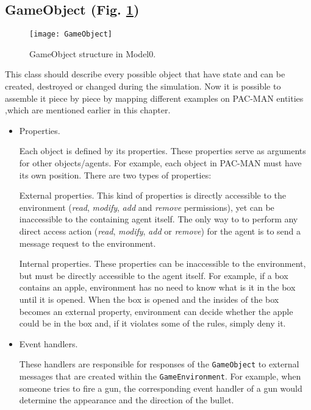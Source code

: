 \subsection{GameObject (Fig. \ref{GameObj})}
 \begin{figure}[p]
    \begin{center}
      \texttt{[image: GameObject]}
      \caption{GameObject structure in Model0.}
      \label{GameObj}
     \end{center}
    \end{figure}
This class should describe every possible object that have state and can be created, destroyed or changed during the simulation.
Now it is possible to assemble it piece by piece by mapping different examples on PAC-MAN entities ,which are mentioned earlier in this chapter.
\begin{itemize}
\item Properties. \par
Each object is defined by its properties.
These properties serve as arguments for other objects/agents. For example, each object in PAC-MAN must have its own position. There are two types of properties:
\begin{definition}{External properties}. This kind of properties is directly accessible to the environment (\textit{read}, \textit{modify}, \textit{add} and \textit{remove} permissions), yet can be inaccessible to the containing agent itself. The only way to to perform any direct access action (\textit{read}, \textit{modify}, \textit{add} or \textit{remove}) for the agent is to send a message request to the environment.
 \end{definition}
\begin{definition}{Internal properties.} These properties can be inaccessible to the environment, but must be directly accessible to the agent itself. For example, if a box contains an apple, environment has no need to know what is it in the box until it is opened. When the box is opened and the insides of the box becomes an external property, environment can decide whether the apple could be in the box and, if it violates some of the rules, simply deny it.
 \end{definition}
\item \begin{definition}{Event handlers.} \par
These handlers are responsible for responses of the \texttt{GameObject} to external messages that are created within the \texttt{GameEnvironment}. For example, when someone tries to fire a gun, the corresponding event handler of a gun would determine the appearance and the direction of the bullet.
\end{definition}
\end{itemize}
